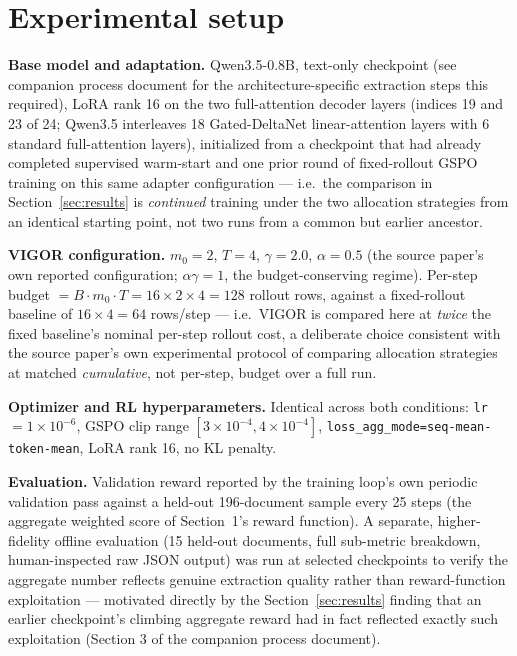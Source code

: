 \documentclass[11pt]{article}
\begin{document}
\section{Experimental setup}

\textbf{Base model and adaptation.} Qwen3.5-0.8B, text-only checkpoint (see companion
process document for the architecture-specific extraction steps this required),
LoRA rank 16 on the two full-attention decoder layers (indices 19 and 23 of 24;
Qwen3.5 interleaves 18 Gated-DeltaNet linear-attention layers with 6 standard
full-attention layers), initialized from a checkpoint that had already completed
supervised warm-start and one prior round of fixed-rollout GSPO training on this
same adapter configuration — i.e.\ the comparison in Section~\ref{sec:results} is
\emph{continued} training under the two allocation strategies from an identical
starting point, not two runs from a common but earlier ancestor.

\textbf{VIGOR configuration.} $m_0=2$, $T=4$, $\gamma=2.0$, $\alpha=0.5$ (the source
paper's own reported configuration; $\alpha\gamma=1$, the budget-conserving
regime). Per-step budget $= B\cdot m_0\cdot T = 16\times2\times4=128$ rollout rows,
against a fixed-rollout baseline of $16\times4=64$ rows/step — i.e.\ VIGOR is
compared here at \emph{twice} the fixed baseline's nominal per-step rollout cost, a
deliberate choice consistent with the source paper's own experimental protocol of
comparing allocation strategies at matched \emph{cumulative}, not per-step, budget
over a full run.

\textbf{Optimizer and RL hyperparameters.} Identical across both conditions:
\texttt{lr}$=1\times10^{-6}$, GSPO clip range $[3\times10^{-4}, 4\times10^{-4}]$,
\texttt{loss\_agg\_mode=seq-mean-token-mean}, LoRA rank 16, no KL penalty.

\textbf{Evaluation.} Validation reward reported by the training loop's own
periodic validation pass against a held-out 196-document sample every 25 steps
(the aggregate weighted score of Section~1's reward function). A separate,
higher-fidelity offline evaluation (15 held-out documents, full sub-metric
breakdown, human-inspected raw JSON output) was run at selected checkpoints to
verify the aggregate number reflects genuine extraction quality rather than
reward-function exploitation — motivated directly by the Section~\ref{sec:results}
finding that an earlier checkpoint's climbing aggregate reward had in fact
reflected exactly such exploitation (Section 3 of the companion process document).
\end{document}
